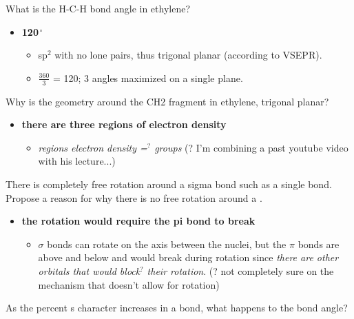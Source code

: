 \documentclass[12pt,a4paper]{article}
\begin{document}
\begin{enumerate}
    {\color{G-Moon}\item What is the H-C-H bond angle in ethylene?}
        \begin{itemize}
            \item {\color{o-Sun}\textbf{120}$^{\bm{\,\circ}}$}
                \begin{itemize}
                    \item sp\(^{2}\) with no lone pairs, thus trigonal planar (according to VSEPR).
                    \item \(\frac{360}{3}\) = 120; 3 angles maximized on a single plane. 
                \end{itemize}
        \end{itemize}
    {\color{G-Moon}\item Why is the geometry around the CH2 fragment in ethylene, trigonal  planar?}
        \begin{itemize}
            \item {\color{o-Sun}\textbf{there are three regions of electron density}}
                \begin{itemize}
                    \item \textit{regions electron density =\(^{?}\) groups} (? I'm combining a past youtube video with his lecture...)
                \end{itemize}
        \end{itemize}
    {\color{G-Moon}\item There is completely free rotation around a sigma bond such as a  single bond. Propose a reason for why there is no free rotation around a .}
        \begin{itemize}
            \item {\color{o-Sun}\textbf{the rotation would require the  pi bond to break}}
                \begin{itemize}
                    \item $\sigma$ bonds can rotate on the axis between the nuclei, but the $\pi$ bonds are above and below and would break during rotation since \textit{there are other orbitals that would block\(^{?}\) their rotation}. (? not completely sure on the mechanism that doesn't allow for rotation)
                \end{itemize}
        \end{itemize}
    {\color{G-Moon}\item As the percent s character increases in a bond, what happens to the bond angle?}
        \begin{itemize}

\end{itemize}
\end{enumerate}
\end{document}
